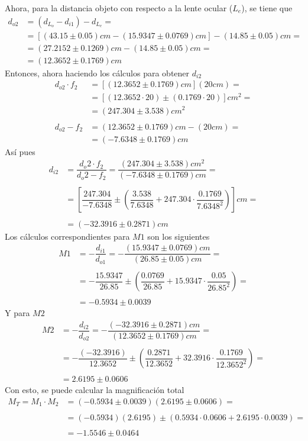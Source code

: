 \documentclass[10pt,a4paper]{article}
\begin{document}
Ahora, para la distancia objeto con respecto a la lente ocular ($ L_e $), se tiene que
\begin{align*}
	d_{o2}&=(d_{L_o}-d_{i1})-d_{L_e}=\\
	&=[(43.15\pm0.05)cm-(15.9347\pm0.0769)cm]-(14.85\pm0.05)cm=\\
	&=(27.2152\pm0.1269)cm-(14.85\pm0.05)cm=\\
	&=(12.3652\pm0.1769)cm
\end{align*} 
Entonces, ahora haciendo los cálculos para obtener $d_{i2}$
\begin{align*}
	d_{o2}\cdot f_2&=[(12.3652\pm0.1769)cm](20cm)=\\
	&=\left[(12.3652\cdot20)\pm\left(0.1769\cdot20\right)\right]cm^2=\\
	&=(247.304\pm3.538)cm^2\\\\
	d_{o2}-f_2&=(12.3652\pm0.1769)cm-(20cm)=\\
	&=(-7.6348\pm0.1769)cm
\end{align*}
Así pues 
\begin{align*}
	d_{i2}&=\dfrac{d_o2\cdot f_2}{d_o2-f_2}=\dfrac{(247.304\pm3.538)cm^2}{(-7.6348\pm0.1769)cm}=\\\\
	&=\left[\dfrac{247.304}{-7.6348}\pm\left(\dfrac{3.538}{7.6348}+247.304\cdot\dfrac{0.1769}{7.6348^2}\right)\right]cm=\\\\
	&=(-32.3916\pm 0.2871)cm
\end{align*}
Los cálculos correspondientes para $M1$ son los siguientes
\begin{align*}
	M1&=-\dfrac{d_{i1}}{d_{o1}}=-\dfrac{(15.9347\pm0.0769)cm}{(26.85\pm 0.05) cm}=\\\\
	&=-\dfrac{15.9347}{26.85}\pm\left(\dfrac{0.0769}{26.85}+15.9347\cdot\dfrac{0.05}{26.85^2}\right)=\\\\
	&=-0.5934\pm0.0039 
\end{align*}
Y para $M2$
\begin{align*}
	M2&=-\dfrac{d_{i2}}{d_{o2}}=-\dfrac{(-32.3916\pm 0.2871) cm}{(12.3652\pm0.1769)cm}=\\\\
	&=-\dfrac{(-32.3916)}{12.3652}\pm\left(\dfrac{0.2871}{12.3652}+32.3916\cdot\dfrac{0.1769}{12.3652^2}\right)=\\\\
	&=2.6195\pm0.0606
\end{align*}
Con esto, se puede calcular la magnificación total
\begin{align*}
	M_T=M_1\cdot M_2&=(-0.5934\pm0.0039)(2.6195\pm0.0606)=\\\\
	&=(-0.5934)(2.6195)\pm\left(0.5934\cdot0.0606+2.6195\cdot0.0039\right)=\\\\
	&=-1.5546\pm0.0464 
\end{align*}
\end{document}
